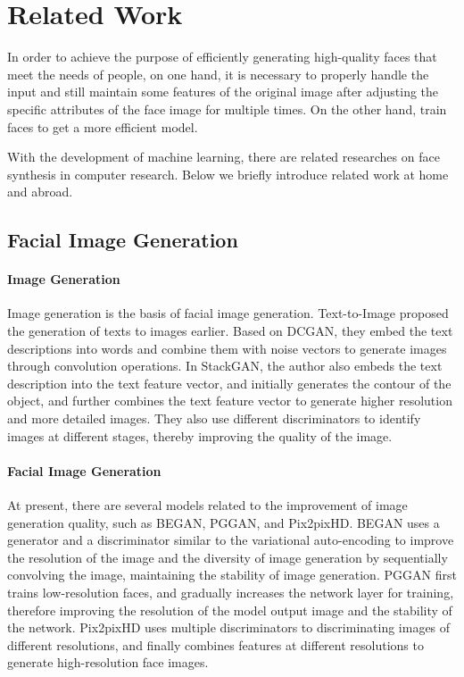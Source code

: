 \section{Related Work}

In order to achieve the purpose of efficiently generating high-quality faces that meet the needs of people, on one hand,
    it is necessary to properly handle the input and still maintain some features of the original image after adjusting the specific attributes of the face image for multiple times.
On the other hand, train faces to get a more efficient model.

With the development of machine learning, there are related researches on face synthesis in computer research.
Below we briefly introduce related work at home and abroad.


\subsection{Facial Image Generation}

\paragraph{Image Generation}

Image generation is the basis of facial image generation.
Text-to-Image proposed the generation of texts to images earlier.
Based on DCGAN, they embed the text descriptions into words and combine them with noise vectors to generate images through convolution operations.
In StackGAN, the author also embeds the text description into the text feature vector,
    and initially generates the contour of the object,
    and further combines the text feature vector to generate higher resolution and more detailed images.
They also use different discriminators to identify images at different stages, thereby improving the quality of the image.


\paragraph{Facial Image Generation}

At present, there are several models related to the improvement of image generation quality,
    such as BEGAN, PGGAN, and Pix2pixHD.
BEGAN uses a generator and a discriminator similar to the variational auto-encoding to improve the resolution of the image and the diversity of image generation by sequentially convolving the image,
    maintaining the stability of image generation.
PGGAN first trains low-resolution faces,
    and gradually increases the network layer for training,
    therefore improving the resolution of the model output image and the stability of the network.
Pix2pixHD uses multiple discriminators to discriminating images of different resolutions,
    and finally combines features at different resolutions to generate high-resolution face images.


